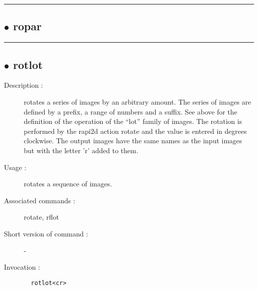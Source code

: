 \hrule \subsection*{$\bullet$ ropar}

\hrule \subsection*{$\bullet$ rotlot}
\begin{description}
\item[Description :] rotates a series of images by an arbitrary amount.  The series
of images are defined by a prefix, a range of numbers and a suffix. See
above for the definition of the operation of the ``lot'' family of images.
The rotation is performed by the rapi2d action rotate and the value is
entered in degrees clockwise.  The output images have the same names as
the input images but with the letter 'r' added to them.
\item[Usage :] rotates a sequence of images.
\item[Associated commands :] rotate, rflot
\item[Short version of command :] -
\item[Invocation :]

\verb+  rotlot<cr> +\end{description}

